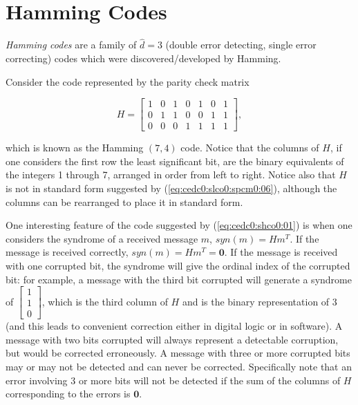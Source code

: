 \section{Hamming Codes}
\label{cedc0:shco0}

\emph{Hamming codes} are a family of $\hat{d}=3$ (double 
error detecting, single error correcting) codes which were discovered/developed
by Hamming.

Consider the code represented by the parity check matrix

\begin{equation}
\label{eq:cedc0:shco0:01}
H = \left[
    \begin{array}{ccccccc}
    1 & 0 & 1 & 0 & 1 & 0 & 1 \\
    0 & 1 & 1 & 0 & 0 & 1 & 1 \\
    0 & 0 & 0 & 1 & 1 & 1 & 1
    \end{array}
    \right] ,
\end{equation}

\noindent{}which is known as the Hamming $(7, 4)$ code.  Notice that 
the columns of $H$, if one considers the first row the least significant bit, are the 
binary equivalents of the integers 1 through 7, arranged in order from left to right.  Notice
also that $H$ is not in standard form
suggested by
(\ref{eq:cedc0:slco0:spcm0:06}), although the columns can be rearranged to 
place it in standard form.

One interesting feature of the code suggested by (\ref{eq:cedc0:shco0:01})
is when one considers the syndrome of a received message $m$, $syn(m) = Hm^T$.
If the message is received correctly, $syn(m) = Hm^T = \mathbf{0}$.  If the
message is received with one corrupted bit, the syndrome will give the ordinal
index of the corrupted bit:  for example, a message with the third bit corrupted will
generate a syndrome of $\left[\begin{array}{c}1\\1\\0\end{array}\right]$, which is the
third column of $H$ and is the binary representation of 3 (and this leads to
convenient correction either in digital logic or in software).  A message with two bits 
corrupted will always represent a detectable corruption, but would be corrected
erroneously.  A message with three or more corrupted bits may or may not be 
detected and 
can never be corrected.  Specifically note that an error involving 3 or more bits
will not be detected if the sum of the columns of $H$ corresponding to the errors
is $\mathbf{0}$.

